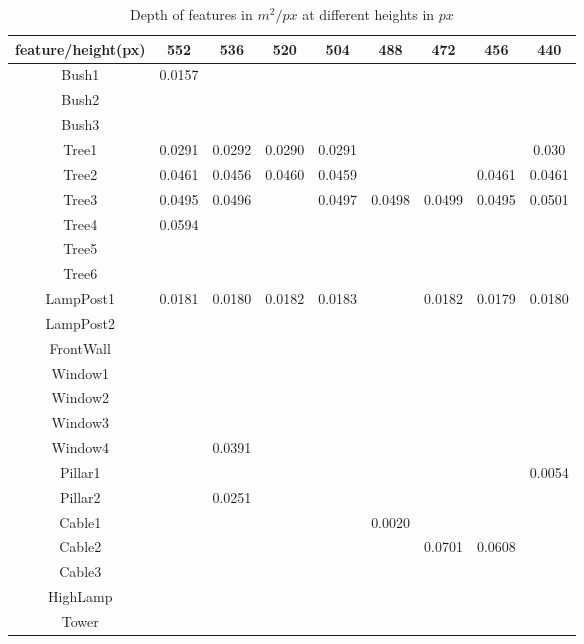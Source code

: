 \begin{table}[!htb]
\centering
    \begin{tabular}{| c | c | c | c | c | c | c | c | c |}
    \hline
    feature/height(px) & 552 & 536 & 520 & 504 & 488 & 472 & 456 & 440\\ \hline
		 Bush1 & 0.0157 &  &  &  &  &  &  & \\ \hline
		 Bush2 &  &  &  &  &  &  &  & \\ \hline	
		 Bush3 &  &  &  &  &  &  &  & \\ \hline	
		 Tree1 & 0.0291 & 0.0292 & 0.0290 & 0.0291 &  &  &  & 0.030 \\ \hline	
		 Tree2 & 0.0461 & 0.0456 & 0.0460 & 0.0459 &  &  & 0.0461 & 0.0461\\ \hline	
		 Tree3 & 0.0495 & 0.0496 &  & 0.0497 & 0.0498 & 0.0499 & 0.0495 & 0.0501 \\ \hline	
		 Tree4 & 0.0594 &  &  &  &  &  &  & \\ \hline	
		 Tree5 &  &  &  &  &  &  &  & \\ \hline	
		 Tree6 &  &  &  &  &  &  &  & \\ \hline	
     LampPost1 & 0.0181 & 0.0180 & 0.0182 & 0.0183 &  & 0.0182 & 0.0179 & 0.0180 \\ \hline
		 LampPost2 &  &  &  &  &  &  &  & \\ \hline
		 FrontWall &  &  &  &  &  &  &  & \\ \hline
		 Window1 &  &  &  &  &  &  &  & \\ \hline
		 Window2 &  &  &  &  &  &  &  & \\ \hline
		 Window3 &  &  &  &  &  &  &  & \\ \hline
		 Window4 &  & 0.0391 &  &  &  &  &  & \\ \hline
		 Pillar1 &  &  &  &  &  &  &  & 0.0054 \\ \hline
		 Pillar2 &  & 0.0251 &  &  &  &  &  & \\ \hline
		 Cable1 &  &  &  &  & 0.0020 &  &  & \\ \hline
	   Cable2 &  &  &  &  &  & 0.0701 & 0.0608 & \\ \hline
	   Cable3 &  &  &  &  &  &  &  & \\ \hline
		 HighLamp &  &  &  &  &  &  &  & \\ \hline
	   Tower &  &  &  &  &  &  &  & \\ \hline
    \end{tabular}
		\caption{Depth of features in $m^2/px$ at different heights in $px$}\label{table2}
\end{table}

